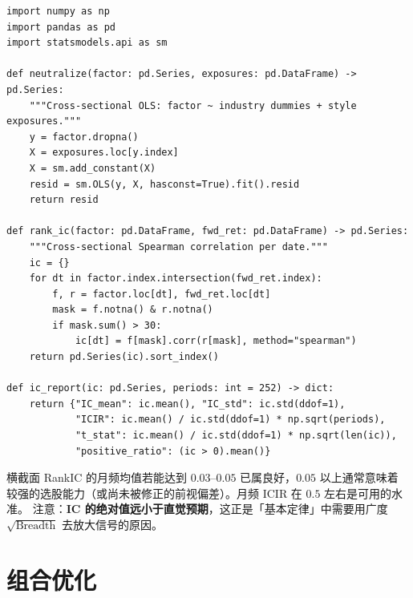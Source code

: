\begin{lstlisting}[style=pythonstyle,
  caption={因子中性化与信息系数（IC）计算},
  label={lst:factor}]
import numpy as np
import pandas as pd
import statsmodels.api as sm

def neutralize(factor: pd.Series, exposures: pd.DataFrame) -> pd.Series:
    """Cross-sectional OLS: factor ~ industry dummies + style exposures."""
    y = factor.dropna()
    X = exposures.loc[y.index]
    X = sm.add_constant(X)
    resid = sm.OLS(y, X, hasconst=True).fit().resid
    return resid

def rank_ic(factor: pd.DataFrame, fwd_ret: pd.DataFrame) -> pd.Series:
    """Cross-sectional Spearman correlation per date."""
    ic = {}
    for dt in factor.index.intersection(fwd_ret.index):
        f, r = factor.loc[dt], fwd_ret.loc[dt]
        mask = f.notna() & r.notna()
        if mask.sum() > 30:
            ic[dt] = f[mask].corr(r[mask], method="spearman")
    return pd.Series(ic).sort_index()

def ic_report(ic: pd.Series, periods: int = 252) -> dict:
    return {"IC_mean": ic.mean(), "IC_std": ic.std(ddof=1),
            "ICIR": ic.mean() / ic.std(ddof=1) * np.sqrt(periods),
            "t_stat": ic.mean() / ic.std(ddof=1) * np.sqrt(len(ic)),
            "positive_ratio": (ic > 0).mean()}
\end{lstlisting}

\begin{appbox}[IC 与 IR 的经验尺度]
横截面 RankIC 的月频均值若能达到 $0.03$--$0.05$ 已属良好，$0.05$ 以上通常意味着
较强的选股能力（或尚未被修正的前视偏差）。月频 ICIR 在 $0.5$ 左右是可用的水准。
注意：\textbf{IC 的绝对值远小于直觉预期}，这正是「基本定律」中需要用广度 $\sqrt{\text{Breadth}}$
去放大信号的原因。
\end{appbox}

\section{组合优化}

